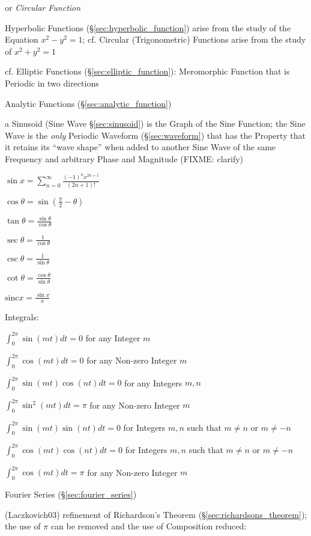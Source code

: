or \emph{Circular Function}

Hyperbolic Functions (\S\ref{sec:hyperbolic_function}) arise from the study of
the Equation $x^2 - y^2 = 1$; cf. Circular (Trigonometric) Functions arise from
the study of $x^2 + y^2 = 1$

cf. Elliptic Functions (\S\ref{sec:elliptic_function}): Meromorphic Function
that is Periodic in two directions

Analytic Functions (\S\ref{sec:analytic_function})

a Sinusoid (Sine Wave \S\ref{sec:sinusoid}) is the Graph of the Sine Function;
the Sine Wave is the \emph{only} Periodic Waveform (\S\ref{sec:waveform}) that
has the Property that it retains its ``wave shape'' when added to another Sine
Wave of the same Frequency and arbitrary Phase and Magnitude (FIXME: clarify)

$\sin x = \sum_{n=0}^\infty \frac{(-1)^n x^{2n+1}}{(2n + 1)!}$

$\cos\theta= \sin(\frac{\pi}{2} - \theta)$

$\tan\theta = \frac{\sin\theta}{\cos\theta}$

$\sec\theta = \frac{1}{\cos\theta}$

$\csc\theta = \frac{1}{\sin\theta}$

$\cot\theta = \frac{\cos\theta}{\sin\theta}$

$\mathrm{sinc} x = \frac{\sin x}{x}$

Integrals:

$\int_0^{2\pi} \sin(mt)dt = 0$ for any Integer $m$

$\int_0^{2\pi} \cos(mt)dt = 0$ for any Non-zero Integer $m$

$\int_0^{2\pi} \sin(mt)\cos(nt)dt = 0$ for any Integers $m,n$

$\int_0^{2\pi} \sin^2(mt)dt = \pi$ for any Non-zero Integer $m$

$\int_0^{2\pi} \sin(mt)\sin(nt)dt = 0$ for Integers $m,n$ such that $m\neq{n}$
or $m\neq{-n}$

$\int_0^{2\pi} \cos(mt)\cos(nt)dt = 0$ for Integers $m,n$ such that $m\neq{n}$
or $m\neq{-n}$

$\int_0^{2\pi} \cos(mt)dt = \pi$ for any Non-zero Integer $m$

\fist Fourier Series (\S\ref{sec:fourier_series})

(Laczkovich03) refinement of Richardson's Theorem
(\S\ref{sec:richardsons_theorem}); the use of $\pi$ can be removed and the use
of Composition reduced:

